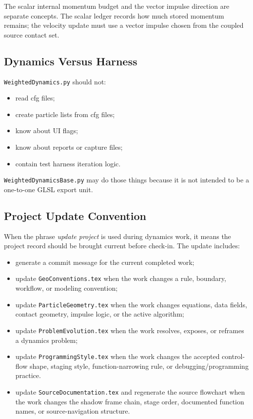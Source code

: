 The scalar internal momentum budget and the vector impulse direction are
separate concepts.  The scalar ledger records how much stored momentum remains;
the velocity update must use a vector impulse chosen from the coupled source
contact set.

\subsection{Dynamics Versus Harness}

\texttt{WeightedDynamics.py} should not:

\begin{itemize}
    \item read cfg files;
    \item create particle lists from cfg files;
    \item know about UI flags;
    \item know about reports or capture files;
    \item contain test harness iteration logic.
\end{itemize}

\texttt{WeightedDynamicsBase.py} may do those things because it is not intended to be a
one-to-one GLSL export unit.

\subsection{Project Update Convention}

When the phrase \emph{update project} is used during dynamics work, it
means the project record should be brought current before check-in.  The update
includes:

\begin{itemize}[leftmargin=*]
    \item generate a commit message for the current completed work;
    \item update \texttt{GeoConventions.tex} when the work changes a rule,
    boundary, workflow, or modeling convention;
    \item update \texttt{ParticleGeometry.tex} when the work changes equations,
    data fields, contact geometry, impulse logic, or the active algorithm;
    \item update \texttt{ProblemEvolution.tex} when the work resolves,
    exposes, or reframes a dynamics problem;
    \item update \texttt{ProgrammingStyle.tex} when the work changes the
    accepted control-flow shape, staging style, function-narrowing rule, or
    debugging/programming practice.
    \item update \texttt{SourceDocumentation.tex} and regenerate the source
    flowchart when the work changes the shadow frame chain, stage order,
    documented function names, or source-navigation structure.
\end{itemize}

